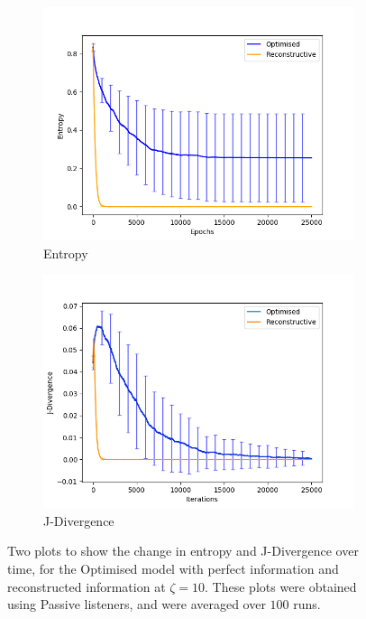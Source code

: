 \begin{figure}[H]
 \centering
  \begin{subfigure}[ht]{0.45\textwidth}
    \includegraphics[width=\textwidth]{Images/Figures/Reconstructive/Entropy_reconstruct_better.png}
    \caption{Entropy}
 \end{subfigure}
 \hfill
 \begin{subfigure}[ht]{0.45\textwidth}
    \includegraphics[width=\textwidth]{Images/Figures/Reconstructive/J-Div_reconstruct_better.png}
    \caption{J-Divergence}
 \end{subfigure}
 \caption{Two plots to show the change in entropy and J-Divergence over time, for the Optimised model with perfect information and reconstructed information at $\zeta = 10$. These plots were obtained using Passive listeners, and were averaged over $100$ runs.}\label{fig:reconstructive}
\end{figure}

